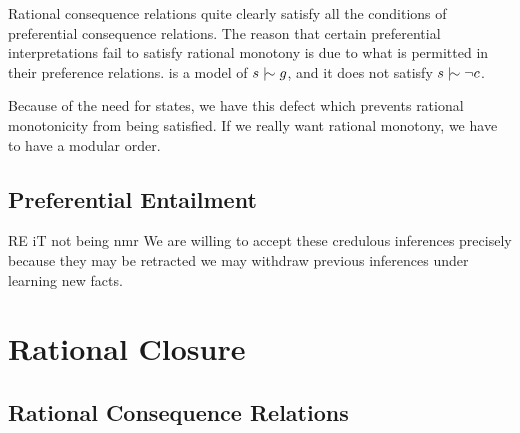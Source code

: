 Rational consequence relations quite clearly satisfy all the conditions of preferential consequence relations. The reason
that certain preferential interpretations fail to satisfy rational monotony is due to what is permitted in their preference
relations.  is a model of $s \twiddle g$, and it does not satisfy $s \twiddle \neg c$.

Because of the need for states, we have this defect which prevents rational monotonicity from being satisfied. If we really
want rational monotony, we have to have a modular order.

\subsection{Preferential Entailment}

RE iT not being nmr We are willing to accept these credulous inferences precisely because they may be retracted we may withdraw
previous inferences under learning new facts.

\section{Rational Closure}

\subsection{Rational Consequence Relations}
